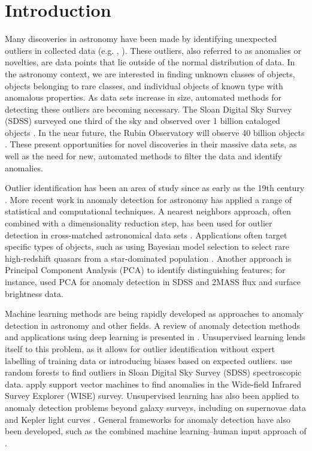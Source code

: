 \documentclass[fleqn,usenatbib,useAMS]{mnras}
\begin{document}

\section{Introduction}

Many discoveries in astronomy have been made by identifying unexpected outliers in collected data (e.g. \citealt{Cardamone2009}, \citealt{Massey2019}). 
These outliers, also referred to as anomalies or novelties, are data points that lie outside of the normal distribution of data.
In the astronomy context, we are interested in finding unknown classes of objects, objects belonging to rare classes, and individual objects of known type with anomalous properties.
As data sets increase in size, automated methods for detecting these outliers are becoming necessary.
The Sloan Digital Sky Survey (SDSS) surveyed one third of the sky and observed over 1 billion cataloged objects \citep{York2000}.
In the near future, the Rubin Observatory will observe 40 billion objects \citep{Ivezic2018}.
These present opportunities for novel discoveries in their massive data sets, as well as the need for new, automated methods to filter the data and identify anomalies.

Outlier identification has been an area of study since as early as the 19th century \citep{Edgeworth1887}.
More recent work in anomaly detection for astronomy has applied a range of statistical and computational techniques.
A nearest neighbors approach, often combined with a dimensionality reduction step, has been used for outlier detection in cross-matched astronomical data sets \citep{Henrion2013}.
Applications often target specific types of objects, such as using Bayesian model selection to select rare high-redshift quasars from a star-dominated population \citep{Mortlock2012}.
Another approach is Principal Component Analysis (PCA) to identify distinguishing features; for instance, \cite{Dutta2007} used PCA for anomaly detection in SDSS and 2MASS flux and surface brightness data.

Machine learning methods are being rapidly developed as approaches to anomaly detection in astronomy and other fields.
A review of anomaly detection methods and applications using deep learning is presented in \cite{Chalapathy2019}.
Unsupervised learning lends itself to this problem, as it allows for outlier identification without expert labelling of training data or introducing biases based on expected outliers.
\cite{Baron2017} use random forests to find outliers in Sloan Digital Sky Survey (SDSS) spectroscopic data.
\cite{Solarz2017} apply support vector machines to find anomalies in the Wide-field Infrared Survey Explorer (WISE) survey.
Unsupervised learning has also been applied to anomaly detection problems beyond galaxy surveys, including on supernovae data \citep{Pruzhinskaya2019} and Kepler light curves \citep{Giles2018}.
General frameworks for anomaly detection have also been developed, such as the combined machine learning--human input approach of \cite{Lochner2020}.
\end{document}

